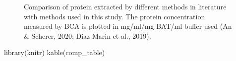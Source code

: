 \documentclass[
  letterpaper,
  DIV=11,
  numbers=noendperiod]{scrreprt}
\newenvironment{Shaded}{\begin{snugshade}}{\end{snugshade}}
\newcommand{\FunctionTok}[1]{\textcolor[rgb]{0.28,0.35,0.67}{#1}}
\newcommand{\NormalTok}[1]{\textcolor[rgb]{0.00,0.23,0.31}{#1}}
\begin{document}
\begin{figure}[H]


\caption{\label{fig-protein_extraction_comparision}Comparison of protein
extracted by different methods in literature with methods used in this
study. The protein concentration measured by BCA is plotted in mg/ml/mg
BAT/ml buffer used (An \& Scherer, 2020; Diaz Marin et al., 2019).}

\end{figure}%

\begin{Shaded}
\begin{Highlighting}[]
\FunctionTok{library}\NormalTok{(knitr)}
\FunctionTok{kable}\NormalTok{(comp\_table)}
\end{Highlighting}
\end{Shaded}
\end{document}
